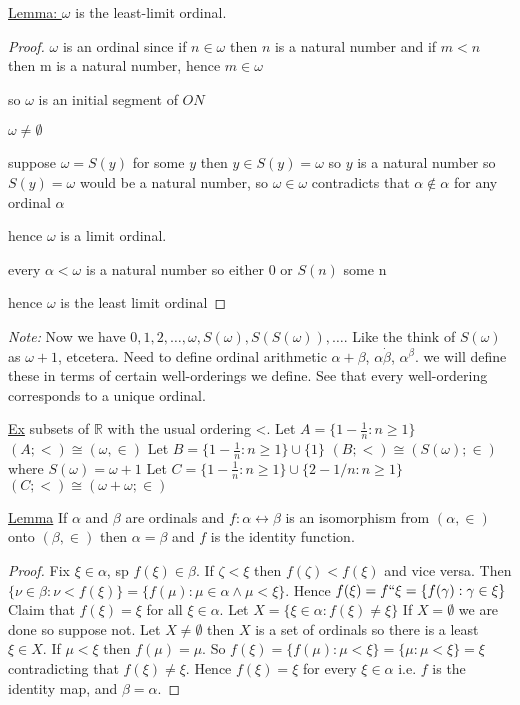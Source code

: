 \documentclass{article}
\begin{document}
    \underline{Lemma: } $\omega$ is the least-limit ordinal.
    \begin{proof}
        $\omega$ is an ordinal since if $n \in \omega$ then $n$ is a natural number and if $m < n$ then m is a natural number, hence $m \in \omega$

        so $\omega$ is an initial segment of $ON$

        $\omega \neq \emptyset$

        suppose $\omega = S(y)$ for some $y$ then $y \in S(y) = \omega$ so $y$ is a natural number so $S(y) = \omega$ would be a natural number, so $\omega \in \omega$ contradicts that $\alpha \notin \alpha$ for any ordinal $\alpha$

        hence $\omega$ is a limit ordinal.

        every $\alpha < \omega$ is a natural number so either 0 or $S(n)$ some n

        hence $\omega$ is the least limit ordinal

    \end{proof}

    \emph{Note: } Now we have $0,1,2,\dots,\omega,S(\omega), S(S(\omega)),\dots$.
    Like the think of $S(\omega)$ as $\omega + 1$, etcetera.
    Need to define ordinal arithmetic $\alpha + \beta$, $\alpha \dot \beta$, $\alpha^{\beta}$.
    we will define these in terms of certain well-orderings we define.
    See that every well-ordering corresponds to a unique ordinal.

    \underline{Ex} subsets of $\mathbb{R}$ with the usual ordering <.
    Let $A = \{1-\frac{1}{n} : n \geq 1\}$
    $(A ; <) \cong (\omega,\in)$
    Let $B = \{ 1-\frac{1}{n}: n \geq 1\}\cup \{1\}$
    $(B;<) \cong (S(\omega); \in)$ where $S(\omega) = \omega + 1$
    Let $C = \{1-\frac{1}{n}:n\geq1\}\cup\{2-1/n:n\geq1\}$
    $(C;<) \cong (\omega + \omega;\in)$


    \underline{Lemma} If $\alpha$ and $\beta$ are ordinals and $f : \alpha \leftrightarrow \beta$ is an isomorphism from $(\alpha,\in)$ onto $(\beta,\in)$ then $\alpha = \beta$ and $f$ is the identity function.

    \begin{proof}
        Fix $\xi \in \alpha$, sp $f(\xi) \in \beta$.
        If $\zeta < \xi$ then $f(\zeta) < f(\xi)$ and vice versa.
        Then $\{\nu \in \beta : \nu < f(\xi)\}=\{f(\mu) : \mu \in \alpha \wedge \mu < \xi\}$.
        Hence $f(\xi) = f``\xi = \{f(\gamma) : \gamma \in \xi\}$
        Claim that $f(\xi) = \xi$ for all $\xi \in \alpha$.
        Let $X = \{\xi \in \alpha : f(\xi) \neq \xi\}$
        If $X = \emptyset$ we are done so suppose not.
        Let $X \neq \emptyset$ then $X$ is a set of ordinals so there is a least $\xi \in X$.
        If $\mu < \xi$ then $f(\mu)=\mu$.
        So $f(\xi)=\{f(\mu) : \mu < \xi\} = \{\mu : \mu < \xi\} = \xi$ contradicting that $f(\xi) \neq \xi$.
        Hence $f(\xi) = \xi $ for every $\xi \in \alpha$ i.e. $f$ is the identity map, and $\beta = \alpha$.
    \end{proof}
\end{document}
